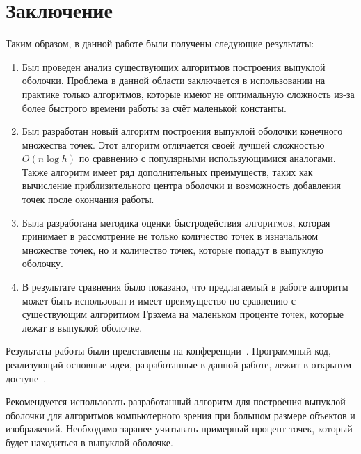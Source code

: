\chapter*{Заключение}						%


Таким образом, в данной работе были получены следующие результаты:
\begin{enumerate}
	\item Был проведен анализ существующих алгоритмов построения выпуклой оболочки. Проблема в данной области заключается в использовании на практике только алгоритмов, которые имеют не оптимальную сложность из-за более быстрого времени работы за счёт маленькой константы.
	\item Был разработан новый алгоритм построения выпуклой оболочки конечного множества точек. Этот алгоритм отличается своей лучшей сложностью $O(n \log h)$ по сравнению с популярными использующимися аналогами. Также алгоритм имеет ряд дополнительных преимуществ, таких как вычисление приблизительного центра оболочки и возможность добавления точек после окончания работы.
	\item Была разработана методика оценки быстродействия алгоритмов, которая принимает в рассмотрение не только количество точек в изначальном множестве точек, но и количество точек, которые попадут в выпуклую оболочку.
	\item В результате сравнения было показано, что предлагаемый в работе алгоритм может быть использован и имеет преимущество по сравнению с существующим алгоритмом Грэхема на маленьком проценте точек, которые лежат в выпуклой оболочке.
\end{enumerate}

Результаты работы были представлены на конференции~\cite{matrokhin2018convex}. Программный код, реализующий основные идеи, разработанные в данной работе, лежит в открытом доступе~\cite{matrokhin2017github}.

Рекомендуется использовать разработанный алгоритм для построения выпуклой оболочки для алгоритмов компьютерного зрения при большом размере объектов и изображений. Необходимо заранее учитывать примерный процент точек, который будет находиться в выпуклой оболочке.

